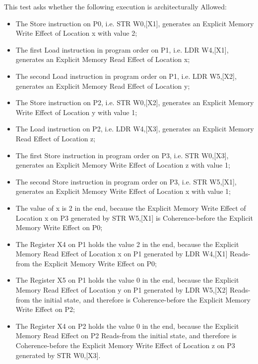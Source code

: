 This test asks whether the following execution is architecturally Allowed:

\begin{itemize}
  \item The Store instruction on P0, i.e. STR W0,[X1], generates an Explicit Memory Write Effect of Location x with value 2;
  \item The first Load instruction in program order on P1, i.e. LDR W4,[X1], generates an Explicit Memory Read Effect of Location x;
  \item The second Load instruction in program order on P1, i.e. LDR W5,[X2], generates an Explicit Memory Read Effect of Location y;
  \item The Store instruction on P2, i.e. STR W0,[X2], generates an Explicit Memory Write Effect of Location y with value 1;
  \item The Load instruction on P2, i.e. LDR W4,[X3], generates an Explicit Memory Read Effect of Location z;
  \item The first Store instruction in program order on P3, i.e. STR W0,[X3], generates an Explicit Memory Write Effect of Location z with value 1;
  \item The second Store instruction in program order on P3, i.e. STR W5,[X1], generates an Explicit Memory Write Effect of Location x with value 1;
  \item The value of x is 2 in the end, because the Explicit Memory Write Effect of Location x on P3 generated by STR W5,[X1] is Coherence-before the Explicit Memory Write Effect on P0;
  \item The Register X4 on P1 holds the value 2 in the end, because the Explicit Memory Read Effect of Location x on P1 generated by LDR W4,[X1] Reads-from the Explicit Memory Write Effect on P0;
  \item The Register X5 on P1 holds the value 0 in the end, because the Explicit Memory Read Effect of Location y on P1 generated by LDR W5,[X2] Reads-from the initial state, and therefore is Coherence-before the Explicit Memory Write Effect on P2;
  \item The Register X4 on P2 holds the value 0 in the end, because the Explicit Memory Read Effect on P2 Reads-from the initial state, and therefore is Coherence-before the Explicit Memory Write Effect of Location z on P3 generated by STR W0,[X3].
\end{itemize}
